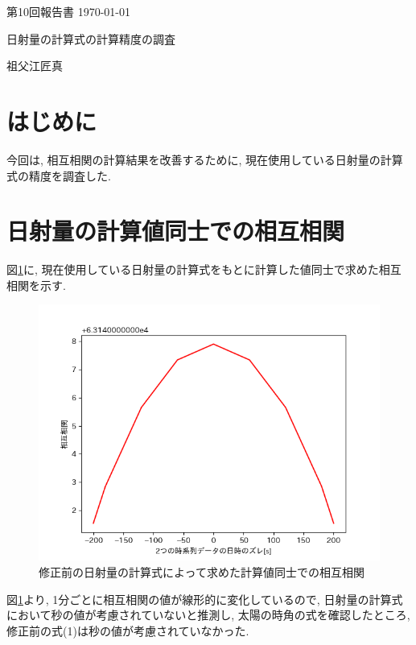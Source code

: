 \documentclass[a4j,12pt,]{jarticle}
\begin{document}
{\noindent\small 第10回報告書 \hfill\today}
\begin{center}
  {\Large 日射量の計算式の計算精度の調査}
\end{center}
\begin{flushright}
  祖父江匠真 \\
\end{flushright}

\section{はじめに}
今回は, 相互相関の計算結果を改善するために, 現在使用している日射量の計算式の精度を調査した.

\section{日射量の計算値同士での相互相関}
図\ref{p1}に, 現在使用している日射量の計算式をもとに計算した値同士で求めた相互相関を示す.

\begin{figure}[H]
  \begin{center}
    \includegraphics[width=160mm]{1.png}
    \caption{修正前の日射量の計算式によって求めた計算値同士での相互相関}
    \label{p1}
  \end{center}
\end{figure}

図\ref{p1}より, 1分ごとに相互相関の値が線形的に変化しているので, 日射量の計算式において秒の値が考慮されていないと推測し, 太陽の時角の式を確認したところ, 修正前の式(1)は秒の値が考慮されていなかった.
\end{document}
